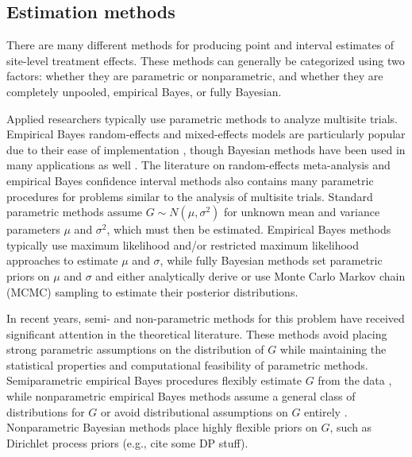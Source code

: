 \documentclass[]{article}
\begin{document}
\subsection{Estimation methods}

There are many different methods for producing point and interval estimates of site-level treatment effects.
These methods can generally be categorized using two factors: whether they are parametric or nonparametric, and whether they are completely unpooled, empirical Bayes, or fully Bayesian.

Applied researchers typically use parametric methods to analyze multisite trials.
Empirical Bayes random-effects and mixed-effects models are particularly popular due to their ease of implementation \citep{bloom2017using}, though Bayesian methods have been used in many applications as well \citep{rubin1981estimation}.
The literature on random-effects meta-analysis \citep{higgins2009re} and empirical Bayes confidence interval methods \citep{morris1983parametric, he1992parametric, gene2009empirical} also contains many parametric procedures for problems similar to the analysis of multisite trials.
Standard parametric methods assume $G \sim N(\mu, \sigma^2)$ for unknown mean and variance parameters $\mu$ and $\sigma^2$, which must then be estimated.
Empirical Bayes methods typically use maximum likelihood and/or restricted maximum likelihood approaches to estimate $\mu$ and $\sigma$, while fully Bayesian methods set parametric priors on $\mu$ and $\sigma$ and either analytically derive or use Monte Carlo Markov chain (MCMC) sampling to estimate their posterior distributions.

In recent years, semi- and non-parametric methods for this problem have received significant attention in the theoretical literature.
These methods avoid placing strong parametric assumptions on the distribution of $G$ while maintaining the statistical properties and computational feasibility of parametric methods.
Semiparametric empirical Bayes procedures flexibly estimate $G$ from the data \citep{laird1987empirical, yu2018adaptive}, while nonparametric empirical Bayes methods assume a general class of distributions for $G$ \citep{ignatiadis2022confidence} or avoid distributional assumptions on $G$ entirely \citep{armstrong2020robust}.
Nonparametric Bayesian methods place highly flexible priors on $G$, such as Dirichlet process priors (e.g., cite some DP stuff).
\end{document}
